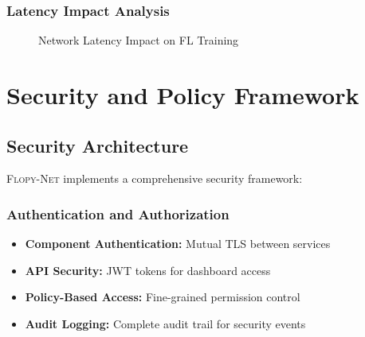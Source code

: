 \documentclass[12pt,a4paper,twoside]{article}
\newcommand{\flopynet}{\textsc{Flopy-Net}}
\begin{document}
\subsubsection{Latency Impact Analysis}

\begin{figure}[H]
\centering
{}
\caption{Network Latency Impact on FL Training}
\label{fig:latency-impact}
\end{figure}

\section{Security and Policy Framework}

\subsection{Security Architecture}

\flopynet{} implements a comprehensive security framework:

\subsubsection{Authentication and Authorization}

\begin{itemize}
    \item \textbf{Component Authentication:} Mutual TLS between services
    \item \textbf{API Security:} JWT tokens for dashboard access
    \item \textbf{Policy-Based Access:} Fine-grained permission control
    \item \textbf{Audit Logging:} Complete audit trail for security events
\end{itemize}
\end{document}
